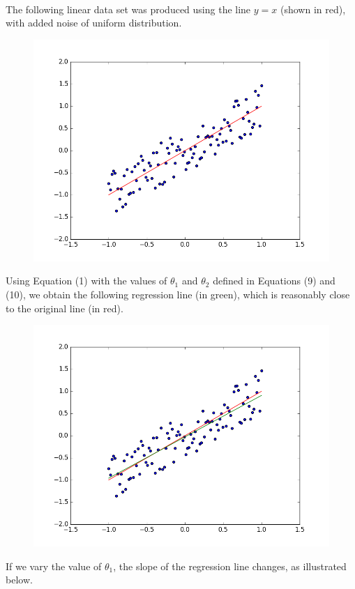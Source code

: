 \documentclass[10pt]{article}
\begin{document}
\\
The following linear data set was produced using the line $y = x$ (shown in red), with added noise of uniform distribution.
\begin{figure}[H]
\includegraphics[scale=0.4]{linearNoise.png}
\end{figure}
Using Equation (1) with the values of $\theta_{1}$ and $\theta_{2}$ defined in Equations (9) and (10), we obtain the following regression line (in green), which is reasonably close to the original line (in red).
\begin{figure}[H]
\includegraphics[scale=0.4]{linearNoiseWithRegression.png}
\end{figure}
\newpage
If we vary the value of $\theta_{1}$, the slope of the regression line changes, as illustrated below.
\end{document}
